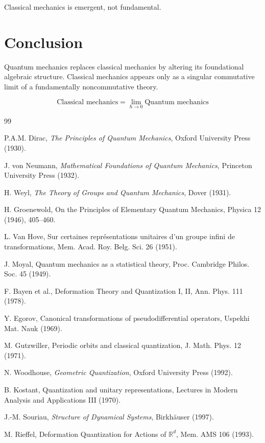 \documentclass[11pt,a4paper]{article}
\begin{document}
Classical mechanics is emergent, not fundamental.

\section{Conclusion}

Quantum mechanics replaces classical mechanics by altering its 
foundational algebraic structure. Classical mechanics appears only as a 
singular commutative limit of a fundamentally noncommutative theory.

\[
\boxed{
\text{Classical mechanics} = \lim_{\hbar\to0} \text{Quantum mechanics}
}
\]

\begin{thebibliography}{99}

P.A.M. Dirac,
\textit{The Principles of Quantum Mechanics},
Oxford University Press (1930).

J. von Neumann,
\textit{Mathematical Foundations of Quantum Mechanics},
Princeton University Press (1932).

H. Weyl,
\textit{The Theory of Groups and Quantum Mechanics},
Dover (1931).

H. Groenewold,
On the Principles of Elementary Quantum Mechanics,
Physica 12 (1946), 405–460.

L. Van Hove,
Sur certaines représentations unitaires d'un groupe infini de transformations,
Mem. Acad. Roy. Belg. Sci. 26 (1951).

J. Moyal,
Quantum mechanics as a statistical theory,
Proc. Cambridge Philos. Soc. 45 (1949).

F. Bayen et al.,
Deformation Theory and Quantization I, II,
Ann. Phys. 111 (1978).

Y. Egorov,
Canonical transformations of pseudodifferential operators,
Uspekhi Mat. Nauk (1969).

M. Gutzwiller,
Periodic orbits and classical quantization,
J. Math. Phys. 12 (1971).

N. Woodhouse,
\textit{Geometric Quantization},
Oxford University Press (1992).

B. Kostant,
Quantization and unitary representations,
Lectures in Modern Analysis and Applications III (1970).

J.-M. Souriau,
\textit{Structure of Dynamical Systems},
Birkhäuser (1997).

M. Rieffel,
Deformation Quantization for Actions of $\mathbb R^d$,
Mem. AMS 106 (1993).

\end{thebibliography}
\end{document}
